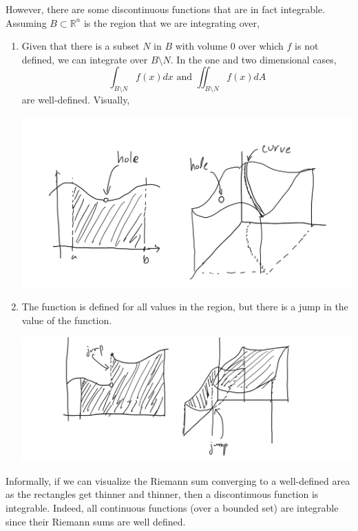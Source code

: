 \documentclass{article}
\theoremstyle{remark}
\theoremstyle{definition}
\begin{document}
However, there are some discontinuous functions that are in fact integrable. Assuming $B \subset \mathbb{R}^n$ is the region that we are integrating over, 
\begin{enumerate}
    \item Given that there is a subset $N$ in $B$ with volume $0$ over which $f$ is not defined, we can integrate over $B \setminus N$. In the one and two dimensional cases, 
    \[\int_{B \setminus N} f(x) dx \text{ and } \iint_{B\setminus N} f(x) dA\]
    are well-defined. Visually, 
    \begin{center}
        \includegraphics[scale=0.2]{img/Integrable_Hole_Function.jpg}
    \end{center}
    \item The function is defined for all values in the region, but there is a jump in the value of the function. 
    \begin{center}
        \includegraphics[scale=0.23]{img/Integrable_Jump_Function.PNG}
    \end{center}
\end{enumerate}
Informally, if we can visualize the Riemann sum converging to a well-defined area as the rectangles get thinner and thinner, then a discontinuous function is integrable. Indeed, all continuous functions (over a bounded set) are integrable since their Riemann sums are well defined. 
\end{document}
